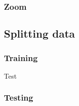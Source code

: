 \subsubsection{Zoom}

\subsection{Splitting data}

\subsubsection{Training}
Test

\subsubsection{Testing}




